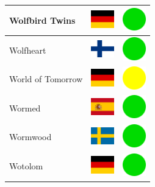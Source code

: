 \documentclass[12pt, a4paper, twoside]{report}
\begin{document}
\begin{center}
\begin{longtable}{|p{5cm}|p{2cm}|p{2cm}|}
 Wolfbird Twins                                             & \includegraphics[width=1cm]{../4x3/de} &   \includegraphics[width=1cm]{../likes/y} \\ \hline
 Wolfheart                                                  & \includegraphics[width=1cm]{../4x3/fi} &   \includegraphics[width=1cm]{../likes/y} \\ \hline
 World of Tomorrow                                          & \includegraphics[width=1cm]{../4x3/de} &   \includegraphics[width=1cm]{../likes/m} \\ \hline
 Wormed                                                     & \includegraphics[width=1cm]{../4x3/es} &   \includegraphics[width=1cm]{../likes/y} \\ \hline
 Wormwood                                                   & \includegraphics[width=1cm]{../4x3/se} &   \includegraphics[width=1cm]{../likes/y} \\ \hline
 Wotolom                                                    & \includegraphics[width=1cm]{../4x3/de} &   \includegraphics[width=1cm]{../likes/y} \\ \hline

\end{longtable}
\end{center}
\end{document}
